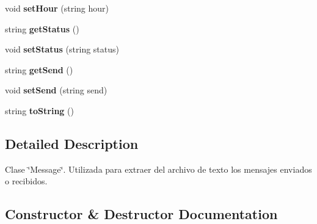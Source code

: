 \begin{DoxyCompactItemize}
\mbox{\label{class_proyecto1__1096917_1_1_message_ac82c347541eb8b4ce48c0e606873a113}} 
void {\bfseries set\+Hour} (string hour)
\item 
\mbox{\label{class_proyecto1__1096917_1_1_message_a4a130fa96a6850303fd1b994665d51a4}} 
string {\bfseries get\+Status} ()
\item 
\mbox{\label{class_proyecto1__1096917_1_1_message_a621ef755eee36b359f109ce7164b9289}} 
void {\bfseries set\+Status} (string status)
\item 
\mbox{\label{class_proyecto1__1096917_1_1_message_abe6b483413463a54218f63af8e66dd51}} 
string {\bfseries get\+Send} ()
\item 
\mbox{\label{class_proyecto1__1096917_1_1_message_a852c238aae9dcc0c31177ab06b91f64c}} 
void {\bfseries set\+Send} (string send)
\item 
\mbox{\label{class_proyecto1__1096917_1_1_message_a9f4885c15c1edaa550f1b19bc17a1b1a}} 
string {\bfseries to\+String} ()
\end{DoxyCompactItemize}


\subsection{Detailed Description}
Clase \char`\"{}\+Message\char`\"{}. Utilizada para extraer del archivo de texto los mensajes enviados o recibidos. 



\subsection{Constructor \& Destructor Documentation}
\mbox{\label{class_proyecto1__1096917_1_1_message_a12cecdedb00d6872604ed24e1b507ee1}} 
